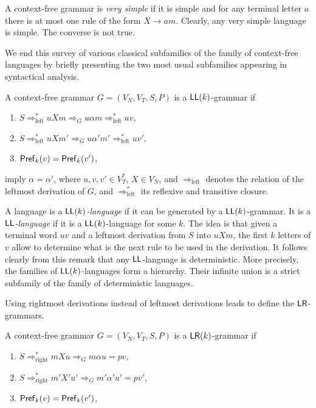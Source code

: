 A context-free grammar is \emph{very simple} if it is simple and for any terminal letter $a$ there is at most one rule of the form $X \to am$. Clearly, any very simple language is simple. The converse is not true.

We end this survey of various classical subfamilies of the family of context-free languages by briefly presenting the two most usual subfamilies appearing in syntactical analysis.

A context-free grammar $G = (V_N, V_T, S, P)$ is a $\textup{\sf LL}(k)$-grammar if

\begin{enumerate}[]
\item $S \Rightarrow^*_{\text{left}} u X m \Rightarrow_G u \alpha m \Rightarrow^*_{\text{left}} uv$,
\item $S \Rightarrow^*_{\text{left}} u X m' \Rightarrow_G u \alpha' m' \Rightarrow^*_{\text{left}} uv'$,
\item $\textup{\sf Pref\/}_k(v) = \textup{\sf Pref\/}_k(v')$,
\end{enumerate}

\noindent imply $\alpha = \alpha'$, where $u, v, v' \in V_T^*$, $X \in V_N$, and $\Rightarrow_{\text{left}}$ denotes the relation of the leftmost derivation of $G$, and $\Rightarrow^*_{\text{left}}$ its reflexive and transitive closure.

A language is a \emph{$\textup{\sf LL}(k)$-language} if it can be generated by a $\textup{\sf LL}(k)$-grammar. It is a \emph{$\textup{\sf LL}$-language} if it is a $\textup{\sf LL}(k)$-language for some $k$. The idea is that given a terminal word $uv$ and a leftmost derivation from $S$ into $uXm$, the first $k$ letters of $v$ allow to determine what is the next rule to be used in the derivation. It follows clearly from this remark that any $\textup{\sf LL}$-language is deterministic. More precisely, the families of $\textup{\sf LL}(k)$-languages form a hierarchy. Their infinite union is a strict subfamily of the family of deterministic languages.

Using rightmost derivations instead of leftmost derivations leads to define the $\textup{\sf LR}$-grammars.

A context-free grammar $G = (V_N, V_T, S, P)$ is a $\textup{\sf LR}(k)$-grammar if

\begin{enumerate}[]
\item $S \Rightarrow^*_{\text{right}} m X u \Rightarrow_G m \alpha u = pv$,
\item $S \Rightarrow^*_{\text{right}} m' X' u' \Rightarrow_G m' \alpha' u' = pv'$,
\item $\textup{\sf Pref\/}_k(v) = \textup{\sf Pref\/}_k(v')$,
\end{enumerate}

